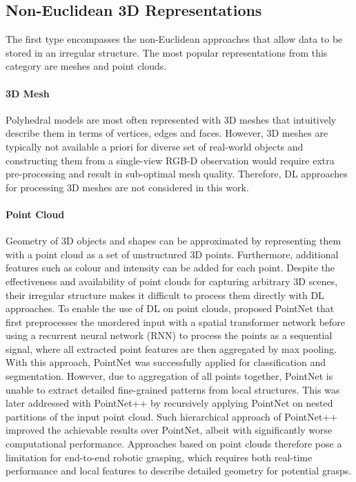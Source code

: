 \subsection{Non-Euclidean 3D Representations}

The first type encompasses the non-Euclidean approaches that allow data to be stored in an irregular structure. The most popular representations from this category are meshes and point clouds.


\paragraph{3D Mesh} Polyhedral models are most often represented with 3D meshes that intuitively describe them in terms of vertices, edges and faces. However, 3D meshes are typically not available a priori for diverse set of real-world objects and constructing them from a single-view RGB-D observation would require extra pre-processing and result in sub-optimal mesh quality. Therefore, DL approaches for processing 3D meshes are not considered in this work.


\paragraph{Point Cloud} Geometry of 3D objects and shapes can be approximated by representing them with a point cloud as a set of unstructured 3D points. Furthermore, additional features such as colour and intensity can be added for each point. Despite the effectiveness and availability of point clouds for capturing arbitrary 3D scenes, their irregular structure makes it difficult to process them directly with DL approaches. To enable the use of DL on point clouds, \citet{ruizhongtai_qi_pointnet_2016} proposed PointNet that first preprocesses the unordered input with a spatial transformer network before using a recurrent neural network (RNN) to process the points as a sequential signal, where all extracted point features are then aggregated by max pooling. With this approach, PointNet was successfully applied for classification and segmentation. However, due to aggregation of all points together, PointNet is unable to extract detailed fine-grained patterns from local structures. This was later addressed with PointNet++ \cite{qi_pointnet_2017} by recursively applying PointNet on nested partitions of the input point cloud. Such hierarchical approach of PointNet++ improved the achievable results over PointNet, albeit with significantly worse computational performance. Approaches based on point clouds therefore pose a limitation for end-to-end robotic grasping, which requires both real-time performance and local features to describe detailed geometry for potential grasps.


